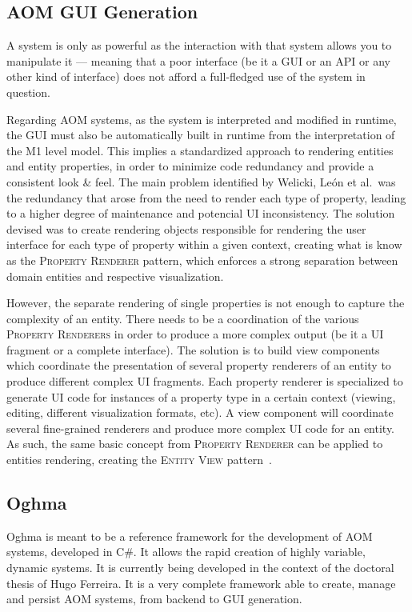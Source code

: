 \subsection{AOM GUI Generation}\label{sec:aom_gui_generation}

A system is only as powerful as the interaction with that system allows you to manipulate it --- meaning that a poor interface (be it a GUI or an API or any other kind of interface) does not afford a full-fledged use of the system in question.

Regarding AOM systems, as the system is interpreted and modified in runtime, the GUI must also be automatically built in runtime from the interpretation of the M1 level model. This implies a standardized approach to rendering entities and entity properties, in order to minimize code redundancy and provide a consistent look \& feel. The main problem identified by Welicki, León et al.\ was the redundancy that arose from the need to render each type of property, leading to a higher degree of maintenance and potencial UI inconsistency. The solution devised was to create rendering objects responsible for rendering the user interface for each type of property within a given context, creating what is know as the \textsc{Property Renderer} pattern, which enforces a strong separation between domain entities and respective visualization.

However, the separate rendering of single properties is not enough to capture the complexity of an entity. There needs to be a coordination of the various \textsc{Property Renderers} in order to produce a more complex output (be it a UI fragment or a complete interface). The solution is to build view components which coordinate the presentation of several property renderers of an entity to produce different complex UI fragments. Each property renderer is specialized to generate UI code for instances of a property type in a certain context (viewing, editing, different visualization formats, etc). A view component will coordinate several fine-grained renderers and produce more complex UI code for an entity. As such, the same basic concept from \textsc{Property Renderer} can be applied to entities rendering, creating the \textsc{Entity View} pattern~\cite{WYW07}.

\subsection{Oghma}\label{sec:oghma}

Oghma is meant to be a reference framework for the development of AOM systems, developed in C\#. It allows the rapid creation of highly variable, dynamic systems. It is currently being developed in the context of the doctoral thesis of Hugo Ferreira. It is a very complete framework able to create, manage and persist AOM systems, from backend to GUI generation.

